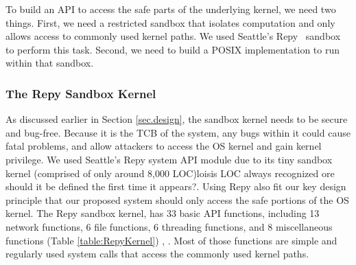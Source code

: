 To build an API to access the safe parts of the underlying kernel, we need
two things.  First, we need a restricted sandbox that isolates computation
and only allows access to commonly used kernel paths.  We used
Seattle's Repy~\cite{Repy-10} sandbox to perform this task.
Second, we need to build a POSIX implementation to run within that sandbox.


\subsubsection{The Repy Sandbox Kernel}

As discussed earlier in Section \ref{sec.design}, the sandbox kernel needs to be secure and bug-free.
Because it is the TCB of the system, any bugs within it could cause fatal problems,
and allow attackers to access the OS kernel and gain kernel privilege.
We used Seattle's Repy system API module due to its tiny sandbox kernel
(comprised of only around 8,000 LOC)lois{is LOC always recognized ore should it be defined the
first time it appears?}. Using Repy also fit our key design principle that
our proposed system should only access the safe portions of the OS kernel.
The Repy sandbox kernel, has 33 basic API functions, including 13 network functions,
6 file functions, 6 threading functions,
and 8 miscellaneous functions
 (Table \ref{table:RepyKernel}) \cite{Repy-10}, \cite{RepyKernel}. Most of those functions are simple and
regularly used system calls that access the commonly used kernel paths.


